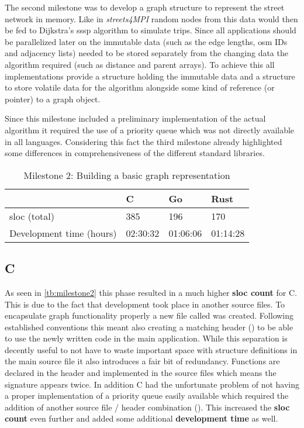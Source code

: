 The second milestone was to develop a graph structure to represent the street network in memory. Like in \textit{streets4MPI} random nodes from this data would then be fed to Dijkstra's \acrshort{sssp} algorithm to simulate trips. Since all applications should be parallelized later on the immutable data (such as the edge lengths, \gls{osm} IDs and adjacency lists) needed to be stored separately from the changing data the algorithm required (such as distance and parent arrays). To achieve this all implementations provide a  structure holding the immutable data and a  structure to store volatile data for the algorithm alongside some kind of reference (or pointer) to a graph object.

Since this milestone included a preliminary implementation of the actual algorithm it required the use of a priority queue which was not directly available in all languages. Considering this fact the third milestone already highlighted some differences in comprehensiveness of the different standard libraries.

\begin{table}[htb]
    \centering
    \begin{tabular}{llll}
        \toprule
            & C
            & Go
            & Rust \\
        \midrule

        \gls{sloc} (total)
            & 385
            & 196
            & 170 \\

        Development time (hours)
            & 02:30:32
            & 01:06:06
            & 01:14:28 \\
        \bottomrule
    \end{tabular}
    \caption{Milestone 2: Building a basic graph representation}
    \label{tb:milestone2}
\end{table}

\subsection{C}
\label{subsec:Implementation::Graph_Representation::C}

As seen in \autoref{tb:milestone2} this phase resulted in a much higher \textbf{\gls{sloc} count} for C. This is due to the fact that development took place in another source files. To encapsulate graph functionality properly a new file called  was created. Following established conventions this meant also creating a matching header () to be able to use the newly written code in the main application. While this separation is decently useful to not have to waste important space with structure definitions in the main source file it also introduces a fair bit of redundancy. Functions are declared in the header and implemented in the source files which means the signature appears twice. In addition C had the unfortunate problem of not having a proper implementation of a priority queue easily available which required the addition of another source file / header combination (). This increased the \textbf{\gls{sloc} count} even further and added some additional \textbf{development time} as well.

